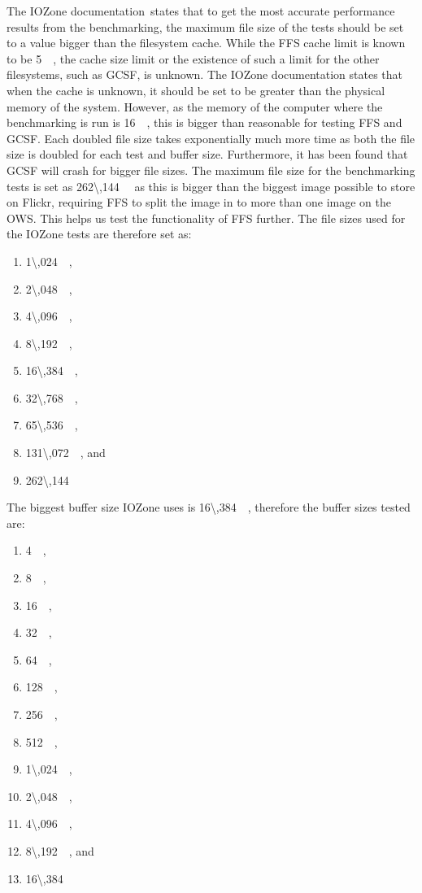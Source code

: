 The IOZone documentation\,\cite{iozoneIozoneFilesystemBenchmark} states that to get the most accurate performance results from the benchmarking, the maximum file size of the tests should be set to a value bigger than the filesystem cache. While the \gls{FFS} cache limit is known to be \SI{5}{\mega\byte}, the cache size limit or the existence of such a limit for the other filesystems, such as \gls{GCSF}, is unknown. The IOZone documentation states that when the cache is unknown, it should be set to be greater than the physical memory of the system. However, as the memory of the computer where the benchmarking is run is \SI{16}{\giga\byte}, this is bigger than reasonable for testing \gls{FFS} and \gls{GCSF}. Each doubled file size takes exponentially much more time as both the file size is doubled for each test and buffer size. Furthermore, it has been found that \gls{GCSF} will crash for bigger file sizes. The maximum file size for the benchmarking tests is set as \SI{262\,144}{\kilo\byte} as this is bigger than the biggest image possible to store on Flickr, requiring \gls{FFS} to split the image in to more than one image on the \gls{OWS}. This helps us test the functionality of FFS further. The file sizes used for the IOZone tests are therefore set as:
\begin{enumerate}
	\item \SI{1\,024}{\kilo\byte},
	\item \SI{2\,048}{\kilo\byte},
	\item \SI{4\,096}{\kilo\byte},
	\item \SI{8\,192}{\kilo\byte},
	\item \SI{16\,384}{\kilo\byte},
	\item \SI{32\,768}{\kilo\byte},
	\item \SI{65\,536}{\kilo\byte},
	\item \SI{131\,072}{\kilo\byte}, and
	\item \SI{262\,144}{\kilo\byte}
\end{enumerate}
The biggest buffer size IOZone uses is \SI{16\,384}{\kilo\byte}, therefore the buffer sizes tested are:
\begin{enumerate}
	\item \SI{4}{\kilo\byte},
	\item \SI{8}{\kilo\byte},
	\item \SI{16}{\kilo\byte},
	\item \SI{32}{\kilo\byte},
	\item \SI{64}{\kilo\byte},
	\item \SI{128}{\kilo\byte},
	\item \SI{256}{\kilo\byte},
	\item \SI{512}{\kilo\byte},
	\item \SI{1\,024}{\kilo\byte},
	\item \SI{2\,048}{\kilo\byte},
	\item \SI{4\,096}{\kilo\byte},
	\item \SI{8\,192}{\kilo\byte}, and
	\item \SI{16\,384}{\kilo\byte}
\end{enumerate}
